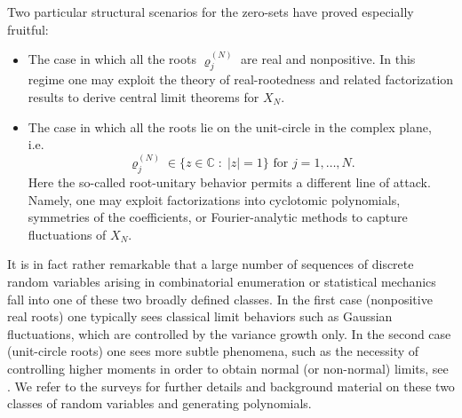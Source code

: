\documentclass[11pt,a4paper]{scrartcl}
\numberwithin{equation}{section}
\theoremstyle{plain}
\theoremstyle{definition}
\theoremstyle{remark}
\begin{document}
Two particular structural scenarios for the zero-sets have proved especially fruitful:
\begin{itemize}
	\item[(i)] The case in which all the roots \(\varrho_{j}^{(N)}\) are real and nonpositive.  In this regime one may exploit the theory of real-rootedness and related factorization results to derive central limit theorems for \(X_{N}\).  
	\item[(ii)] The case in which all the roots lie on the unit-circle in the complex plane, i.e.\  
	\[
	\varrho_{j}^{(N)} \in \{z\in\mathbb{C}\;:\;|z|=1\}\text{ for }j=1,\dots,N.
	\]
	Here the so-called root-unitary behavior permits a different line of attack. Namely, one may exploit factorizations into cyclotomic polynomials, symmetries of the coefficients, or Fourier-analytic methods to capture fluctuations of \(X_{N}\).  
\end{itemize}
It is in fact rather remarkable that a large number of sequences of discrete random variables arising in combinatorial enumeration or statistical mechanics fall into one of these two broadly defined classes.  In the first case (nonpositive real roots) one typically sees classical limit behaviors such as Gaussian fluctuations, which are controlled by the variance growth only.  In the second case (unit-circle roots) one  sees more subtle phenomena, such as the necessity of controlling higher moments in order to obtain normal (or non-normal) limits, see \cite{heerten2024probabilistic,hwang2015limit,RednossThaele}. We refer to the surveys \cite{BilleySwanson,BrandenSurvey} for further details and background material on these two classes of random variables and generating polynomials.
\end{document}

